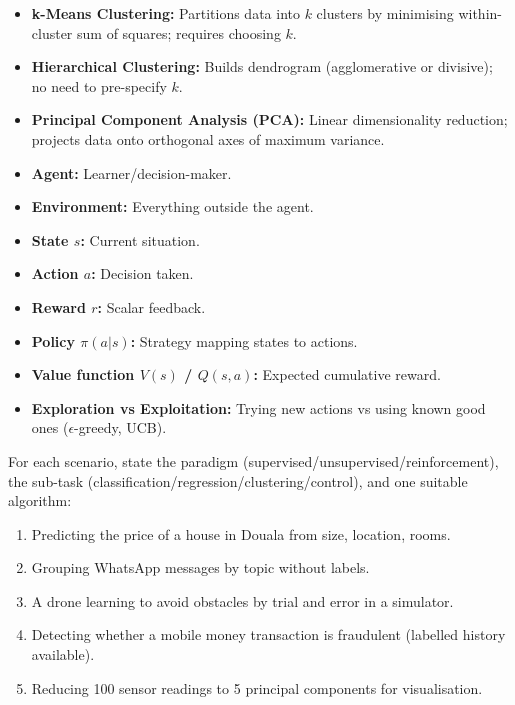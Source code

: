 \documentclass[11pt]{article}
\begin{document}
\begin{definition}
\begin{itemize}
\item \textbf{k-Means Clustering:} Partitions data into $k$ clusters by minimising within-cluster sum of squares; requires choosing $k$.
\item \textbf{Hierarchical Clustering:} Builds dendrogram (agglomerative or divisive); no need to pre-specify $k$.
\item \textbf{Principal Component Analysis (PCA):} Linear dimensionality reduction; projects data onto orthogonal axes of maximum variance.
\end{itemize}
\end{definition}

\begin{definition}
\begin{itemize}
\item \textbf{Agent:} Learner/decision-maker.
\item \textbf{Environment:} Everything outside the agent.
\item \textbf{State $s$:} Current situation.
\item \textbf{Action $a$:} Decision taken.
\item \textbf{Reward $r$:} Scalar feedback.
\item \textbf{Policy $\pi(a|s)$:} Strategy mapping states to actions.
\item \textbf{Value function $V(s)$ / $Q(s,a)$:} Expected cumulative reward.
\item \textbf{Exploration vs Exploitation:} Trying new actions vs using known good ones ($\epsilon$-greedy, UCB).
\end{itemize}
\end{definition}

\begin{exercice}
For each scenario, state the paradigm (supervised/unsupervised/reinforcement), the sub-task (classification/regression/clustering/control), and one suitable algorithm:
\begin{enumerate}
\item Predicting the price of a house in Douala from size, location, rooms.
\item Grouping WhatsApp messages by topic without labels.
\item A drone learning to avoid obstacles by trial and error in a simulator.
\item Detecting whether a mobile money transaction is fraudulent (labelled history available).
\item Reducing 100 sensor readings to 5 principal components for visualisation.
\end{enumerate}
\end{exercice}
\end{document}

